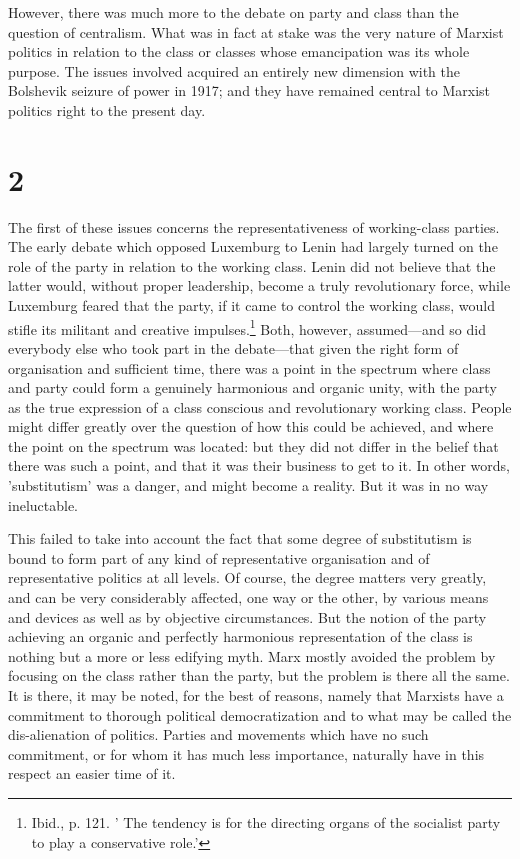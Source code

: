 However, there was much more to the debate on party and class than the question of centralism. What was in fact at stake was the very nature of Marxist politics in relation to the class or classes whose emancipation was its whole purpose. The issues involved acquired an entirely new dimension with the Bolshevik seizure of power in 1917; and they have remained central to Marxist politics right to the present day.

\section*{2}
The first of these issues concerns the representativeness of working-class parties. The early debate which opposed Luxemburg to Lenin had largely turned on the role of the party in relation to the working class. Lenin did not believe that the latter would, without proper leadership, become a truly revolutionary force, while Luxemburg feared that the party, if it came to control the working class, would stifle its militant and creative impulses.\footnote{Ibid., p. 121. ' The tendency is for the directing organs of the socialist party to play a conservative role.'} Both, however, assumed—and so did everybody else who took part in the debate—that given the right form of organisation and sufficient time, there was a point in the spectrum where class and party could form a genuinely harmonious and organic unity, with the party as the true expression of a class conscious and revolutionary working class. People might differ greatly over the question of how this could be achieved, and where the point on the spectrum was located: but they did not differ in the belief that there was such a point, and that it was their business to get to it. In other words, 'substitutism' was a danger, and might become a reality. But it was in no way ineluctable.

This failed to take into account the fact that some degree of substitutism is bound to form part of any kind of representative organisation and of representative politics at all levels. Of course, the degree matters very greatly, and can be very considerably affected, one way or the other, by various means and devices as well as by objective circumstances. But the notion of the party achieving an organic and perfectly harmonious representation of the class is nothing but a more or less edifying myth. Marx mostly avoided the problem by focusing on the class rather than the party, but the problem is there all the same. It is there, it may be noted, for the best of reasons, namely that Marxists have a commitment to thorough political democratization and to what may be called the dis-alienation of politics. Parties and movements which have no such commitment, or for whom it has much less importance, naturally have in this respect an easier time of it.

